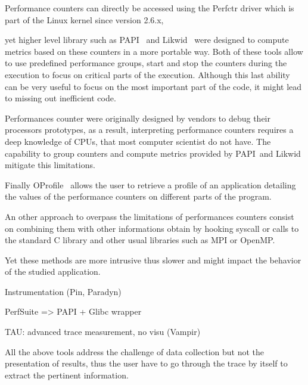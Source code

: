 Performance counters can directly be accessed using the \gls{Perfctr} driver
which is part of the \gls{Linux} kernel since version 2.6.x, 

yet higher level library such as
\gls{PAPI}~\cite{Browne00Portable,Malony11Parallel,Weaver13PAPI} and
\gls{Likwid}~\cite{Treibig10LIKWID} were designed to compute metrics based on
these counters in a more portable way. Both of these tools allow to use
predefined performance groups, start and stop the counters during the
execution to focus on critical parts of the execution. Although this last
ability can be very useful to focus on the most important part of the code, it
might lead to missing out inefficient code.




Performances counter were originally designed by vendors to debug their
processors prototypes, as a result, interpreting performance counters requires
a deep knowledge of \glspl{CPU}, that most computer scientist do not have. The
capability to group counters and compute metrics provided by \gls{PAPI} and
\gls{Likwid} mitigate this limitations.



Finally \gls{OProfile}~\cite{Oprofile}
allows the user to retrieve a profile of an application detailing the values
of the performance counters on different parts of the program.

An other approach to overpass the limitations of performances counters consist
on combining them with other informations obtain by hooking syscall or
calls to the standard C library and other usual libraries such as MPI or
OpenMP.

Yet these methods are more intrusive thus slower and might
impact the behavior of the studied application.



Instrumentation (Pin, Paradyn)

PerfSuite => PAPI + Glibc wrapper


TAU: advanced trace measurement, no visu (Vampir)


All the above tools address the challenge of data collection but not the
presentation of results, thus the user have to go through the trace by itself
to extract the pertinent information.


